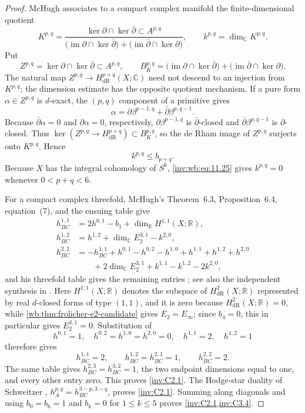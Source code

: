 \begin{proof}
McHugh associates to a compact complex manifold the finite-dimensional
quotient
\[
 K^{p,q}=
 \frac{\ker\partial\cap\ker\bar\partial\subset A^{p,q}}
 {\bigl(\operatorname{im}\partial\cap\ker\bar\partial\bigr)
  +\bigl(\operatorname{im}\bar\partial\cap\ker\partial\bigr)},
 \qquad k^{p,q}=\dim_{\mathbb C}K^{p,q}.
\]
Put
\[
 Z^{p,q}=\ker\partial\cap\ker\bar\partial\subset A^{p,q},
 \qquad
 B_K^{p,q}=
 \bigl(\operatorname{im}\partial\cap\ker\bar\partial\bigr)
 +\bigl(\operatorname{im}\bar\partial\cap\ker\partial\bigr).
\]
The natural map $Z^{p,q}\to H^{p+q}_{\mathrm{dR}}(X;\mathbb C)$ need not
descend to an injection from $K^{p,q}$; the dimension estimate has the
opposite quotient mechanism.  If a pure form $\alpha\in Z^{p,q}$ is
$d$-exact, the $(p,q)$ component of a primitive gives
\[
 \alpha=\partial\beta^{p-1,q}+\bar\partial\beta^{p,q-1}.
\]
Because $\bar\partial\alpha=0$ and $\partial\alpha=0$, respectively,
$\partial\beta^{p-1,q}$ is $\bar\partial$-closed and
$\bar\partial\beta^{p,q-1}$ is $\partial$-closed.  Thus
$\ker(Z^{p,q}\to H^{p+q}_{\mathrm{dR}})\subset B_K^{p,q}$, so the de Rham
image of $Z^{p,q}$ surjects onto $K^{p,q}$.  Hence
\[
 k^{p,q}\le b_{p+q}.
\tag{WBH.11.25}\label{inv:wb:eq:11.25}
\]
Because $X$ has the integral cohomology of $S^6$, \eqref{inv:wb:eq:11.25} gives
$k^{p,q}=0$ whenever $0<p+q<6$.

For a compact complex threefold, McHugh's Theorem~6.3,
Proposition~6.4, equation~(7), and the ensuing table give
\begin{align*}
 h^{1,1}_{BC}
 &=2h^{0,1}-b_1+\dim_{\mathbb R}H^{1,1}(X;\mathbb R),\\
 h^{1,2}_{BC}
 &=h^{1,2}+\dim_{\mathbb C}E_2^{3,1}-k^{2,0},\\
 h^{2,2}_{BC}
 &=-h^{1,1}_{BC}+h^{0,1}-h^{0,2}-h^{1,0}+h^{1,1}
   +h^{1,2}+h^{2,0}\\
 &\hspace{2em}+2\dim_{\mathbb C}E_2^{3,1}
   +k^{1,1}-k^{1,2}-2k^{2,0},
\end{align*}
and his threefold table gives the remaining entries
\cite[Theorem~6.3, Proposition~6.4, equation~(7), \S7.1]{McHugh2018}; see also the
independent synthesis in \cite[\S4]{Angella2018}.  Here
$H^{1,1}(X;\mathbb R)$ denotes the subspace of
$H^2_{\mathrm{dR}}(X;\mathbb R)$ represented by real $d$-closed forms of
type $(1,1)$, and it is zero because $H^2_{\mathrm{dR}}(X;\mathbb R)=0$,
while \cref{wb:thm:frolicher-e2-candidate} gives $E_2=E_\infty$; since
$b_4=0$, this in particular gives $E_2^{3,1}=0$.  Substitution of
\[
 h^{0,1}=1,\quad h^{0,2}=h^{1,0}=h^{2,0}=0,\quad
 h^{1,1}=2,\quad h^{1,2}=1
\]
therefore gives
\[
 h^{1,1}_{BC}=2,\qquad h^{1,2}_{BC}=h^{2,1}_{BC}=1,\qquad
 h^{2,2}_{BC}=2.
\]
The same table gives
$h^{2,3}_{BC}=h^{3,2}_{BC}=1$, the two endpoint dimensions equal to one,
and every other entry zero.  This proves \cref{inv:C2.1}.  The Hodge-star duality
of Schweitzer \cite[\S2.c, pp.~9--10]{Schweitzer2007},
$h_A^{p,q}=h_{BC}^{3-p,3-q}$, proves \cref{inv:C2.1}.  Summing along diagonals and
using $b_0=b_6=1$ and $b_k=0$ for $1\le k\le5$ proves
\cref{inv:C2.1,inv:C3.4}.
\end{proof}

